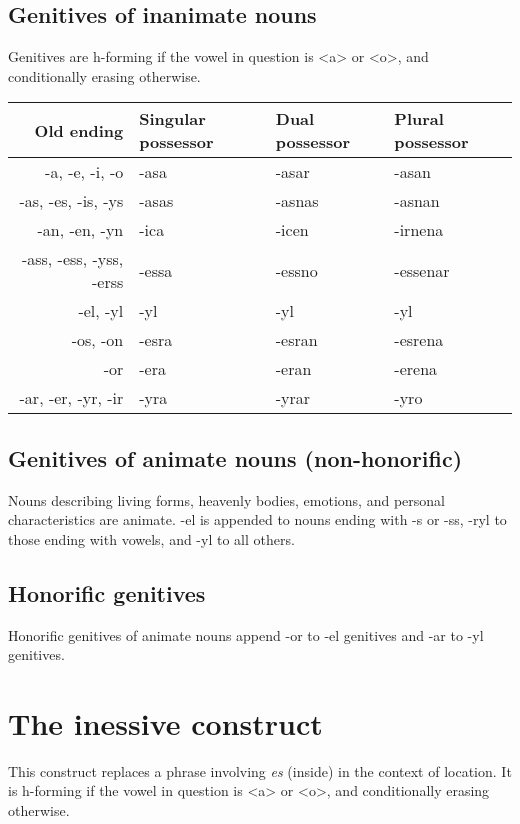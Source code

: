 \documentclass{book}
\begin{document}
\subsection{Genitives of inanimate nouns}

Genitives are h-forming if the vowel in question is <a> or <o>, and conditionally erasing otherwise.

\begin{center}
  \begin{tabular}{|r|l|l|l|}
    \hline
    Old ending & Singular possessor & Dual possessor & Plural possessor \\ \hline
    -a, -e, -i, -o & -asa & -asar & -asan \\
    -as, -es, -is, -ys & -asas & -asnas & -asnan \\
    -an, -en, -yn & -ica & -icen & -irnena \\
    -ass, -ess, -yss, -erss & -essa & -essno & -essenar \\
    -el, -yl & -yl & -yl & -yl \\
    -os, -on & -esra & -esran & -esrena \\
    -or & -era & -eran & -erena \\
    -ar, -er, -yr, -ir & -yra & -yrar & -yro \\ \hline
  \end{tabular}
\end{center}

\subsection{Genitives of animate nouns (non-honorific)}

Nouns describing living forms, heavenly bodies, emotions, and personal characteristics are animate. -el is appended to nouns ending with -s or -ss, -ryl to those ending with vowels, and -yl to all others.

\subsection{Honorific genitives}

Honorific genitives of animate nouns append -or to -el genitives and -ar to -yl genitives.

\section{The inessive construct}

This construct replaces a phrase involving \emph{es} (inside) in the context of location. It is h-forming if the vowel in question is <a> or <o>, and conditionally erasing otherwise.
\end{document}
